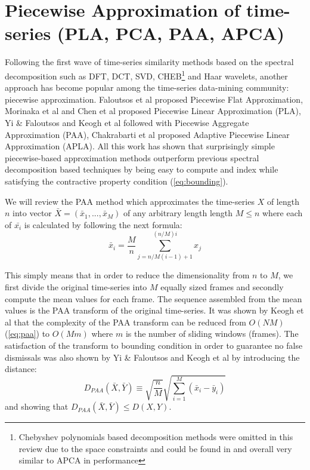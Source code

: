 \section{Piecewise Approximation of time-series (PLA, PCA, PAA, APCA)}
Following the first wave of time-series similarity methods based on the spectral decomposition such as DFT, DCT, SVD, CHEB\footnote{Chebyshev polynomials based decomposition methods were omitted in this review due to the space constraints and could be found in \cite{citeulike:2753031} and overall very similar to APCA in performance}
and Haar wavelets, another approach has become popular among the time-series data-mining community: piecewise approximation. Faloutsos et al \cite{citeulike:4344279} proposed Piecewise Flat Approximation, Morinaka et al \cite{citeulike:4295248} and Chen et al \cite{citeulike:4165220} proposed Piecewise Linear Approximation (PLA), Yi \& Faloutsos \cite{citeulike:2946589} and Keogh et al \cite{citeulike:3000416} followed with Piecewise Aggregate Approximation (PAA), Chakrabarti et al \cite{citeulike:1736140} proposed Adaptive Piecewise Linear Approximation (APLA). All this work has shown that surprisingly simple piecewise-based approximation methods outperform previous spectral decomposition based techniques by being easy to compute and index while satisfying the contractive property condition (\ref{eq:bounding}).

We will review the PAA method which approximates the time-series $X$ of length $n$ into vector $\bar{X} = ( \bar{x}_{1}, ..., \bar{x}_{M} )$ of any arbitrary length length $M \leq n$ where each of $\bar{x_{i}}$ is calculated by following the next formula:
\begin{equation}
\bar{x}_{i} = \frac{M}{n} \sum_{j=n/M(i-1)+1}^{(n/M)i} x_{j}
\label{eq:paa}
\end{equation}

This simply means that in order to reduce the dimensionality from $n$ to $M$, we first divide the original time-series into $M$ equally sized frames and secondly compute the mean values for each frame. The sequence assembled from the mean values is the PAA transform of the original time-series. It was shown by Keogh et al that the complexity of the PAA transform can be reduced from $O(NM)$ (\ref{eq:paa}) to $O(Mm)$ where $m$ is the number of sliding windows (frames). The satisfaction of the transform to bounding condition in order to guarantee no false dismissals was also shown by Yi \& Faloutsos and Keogh et al by introducing the distance:
\begin{equation}
D_{PAA}(\bar{X}, \bar{Y}) \equiv \sqrt{\frac{n}{M}} \sqrt{ \sum_{i=1}^{M} 
\left(  \bar{x}_{i} - \bar{y}_{i} \right)}
\label{eq:paa_distnace}
\end{equation}
and showing that $D_{PAA}(\bar{X}, \bar{Y}) \leq D(X,Y)$.

